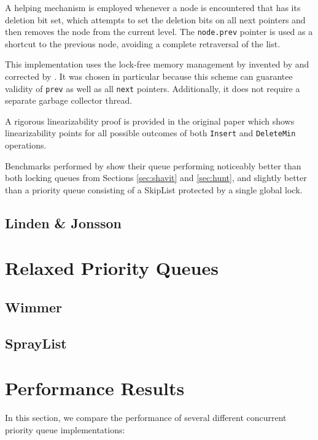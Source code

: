 \documentclass[a4paper,10pt]{article}
\begin{document}
A helping mechanism is employed whenever a node is encountered that has its deletion bit set, which attempts
to set the deletion bits on all next pointers and then removes the node from the current level. The
\lstinline|node.prev| pointer is used as a shortcut to the previous node, avoiding a complete retraversal
of the list.

This implementation uses the lock-free memory management by invented by \citeauthor{valois1996lock}
\cite{valois1995lock,valois1996lock} and corrected by \citeauthor{michael1995correction} 
\cite{michael1995correction}. It was chosen in particular because this scheme can guarantee validity
of \lstinline|prev| as well as all \lstinline|next| pointers. Additionally, it does not require a separate
garbage collector thread.

A rigorous linearizability proof is provided in the original paper \cite{sundell2003fast} which shows
linearizability points for all possible outcomes of both \lstinline|Insert| and \lstinline|DeleteMin|
operations.


Benchmarks performed by \citeauthor{sundell2003fast} show their queue performing noticeably better than both locking 
queues from Sections \ref{sec:shavit} and \ref{sec:hunt}, and slightly better than a priority queue
consisting of a SkipList protected by a single global lock.

\subsection{Linden \& Jonsson}

\section{Relaxed Priority Queues}

\subsection{Wimmer}
\subsection{SprayList}

\section{Performance Results}

In this section, we compare the performance of several different concurrent priority
queue implementations:
\end{document}
